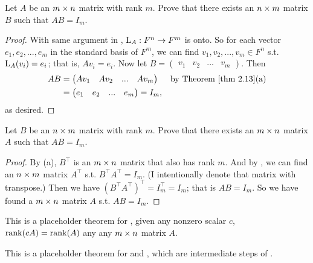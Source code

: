 \begin{exercise} \label{exercise 3.2.21}
Let \(A\) be an \(m \times n\) matrix with rank \(m\).
Prove that there exists an \(n \times m\) matrix \(B\) such that \(AB = I_m\).
\end{exercise}

\begin{proof}
With same argument in , \(\mathrm{L}_A : F^n \to F^m\) is onto.
So for each vector \(e_1, e_2, ..., e_m\) in the standard basis of \(F^m\), we can find \(v_1, v_2, ..., v_m \in F^n\) s.t. \(\mathrm{L}_A(v_i) = e_i\);
that is, \(A v_i = e_i\).
Now let \(B = \begin{pmatrix} v_1 & v_2 & ... & v_m \end{pmatrix}\).
Then
\begin{align*}
    AB & = \begin{pmatrix} A v_1 & A v_2 & ... & A v_m \end{pmatrix} & \text{by \THM{2.13}(a)} \\
       & = \begin{pmatrix} e_1 & e_2 & ... & e_m \end{pmatrix} = I_m,
\end{align*}
as desired.
\end{proof}

\begin{exercise} \label{exercise 3.2.22}
Let \(B\) be an \(n \times m\) matrix with rank \(m\).
Prove that there exists an \(m \times n\) matrix \(A\) such that \(AB = I_m\).
\end{exercise}

\begin{proof}
By (a), \(B^\top\) is an \(m \times n\) matrix that also has rank \(m\).
And by , we can find an \(n \times m\) matrix \(A^\top\) s.t. \(B^\top A^\top = I_m\).
(I intentionally denote that matrix with transpose.)
Then we have \((B^\top A^\top)^\top = I_m^\top = I_m\);
that is \(A B = I_m\).
So we have found a \(m \times n\) matrix \(A\) s.t. \(A B = I_m\).
\end{proof}

\begin{additional theorem} \label{athm 3.5}
This is a placeholder theorem for , given any nonzero scalar \(c\), \(\mathrm{rank}(cA) = \mathrm{rank}(A)\) any any \(m \times n\) matrix \(A\).
\end{additional theorem}

\begin{additional theorem} \label{athm 3.6}
This is a placeholder theorem for  and , which are intermediate steps of .
\end{additional theorem}

